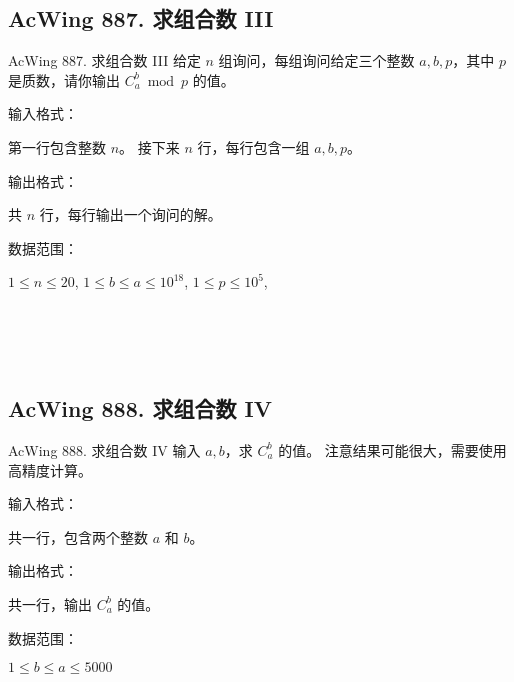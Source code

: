 \subsection{AcWing 887. 求组合数 III}
\begin{titledbox}{AcWing 887. 求组合数 III}
    给定 $n$ 组询问，每组询问给定三个整数 $a, b, p$，其中 $p$ 是质数，请你输出 $C_a^b \bmod p$ 的值。

    输入格式：

    第一行包含整数 $n$。 接下来 $n$ 行，每行包含一组 $a, b, p$。

    输出格式：

    共 $n$ 行，每行输出一个询问的解。

    数据范围：

    $1 \le n \le 20$, $1 \le b \le a \le 10^{18}$, $1 \le p \le 10^5$,

    \begin{inputblock}
         \\
         \\
         \\
    \end{inputblock}
    \begin{outputblock}
    \end{outputblock}
\end{titledbox}

\subsection{AcWing 888. 求组合数 IV}
\begin{titledbox}{AcWing 888. 求组合数 IV}
    输入 $a, b$，求 $C_a^b$ 的值。 注意结果可能很大，需要使用高精度计算。

    输入格式：

    共一行，包含两个整数 $a$ 和 $b$。

    输出格式：

    共一行，输出 $C_a^b$ 的值。

    数据范围：

    $1 \le b \le a \le 5000$

    \begin{inputblock}
    \end{inputblock}
    \begin{outputblock}
    \end{outputblock}
\end{titledbox}

